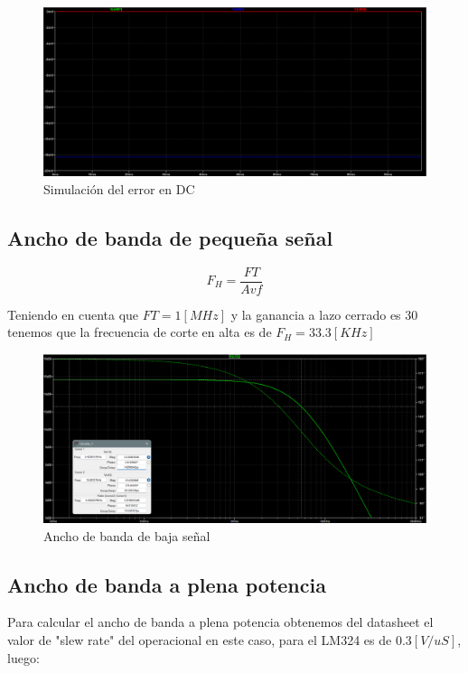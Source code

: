 \documentclass[12pt]{article}
\begin{document}
	\begin{figure}[h!]
		\includegraphics[width=\linewidth]{Imagenes_simulaciones/Sim_Error_DC}
		\caption[Simulación del error en DC]{Simulación del error en DC}
		\label{fig:simerrordc}
	\end{figure}
	
	\subsection{Ancho de banda de pequeña señal}
	
	\begin{equation}
		F_{H}=\frac{FT}{Avf}
	\end{equation}
	
	Teniendo en cuenta que $FT=1[MHz]$ y la ganancia a lazo cerrado es 30 tenemos que la frecuencia de corte en alta es de $F_{H}=33.3[KHz]$
	
	\begin{figure}[h!]
		\includegraphics[width=\linewidth]{Imagenes_simulaciones/Sim_Bode_3db_marcados}
		\caption[Ancho de banda de baja señal]{Ancho de banda de baja señal}
		\label{fig:simbode3dbmarcados}
	\end{figure}

	\subsection{Ancho de banda a plena potencia}
	Para calcular el ancho de banda a plena potencia obtenemos del datasheet el valor de "slew rate" del operacional en este caso, para el LM324 es de $0.3[V/uS]$, luego:
	
\end{document}
